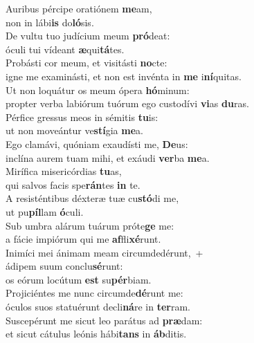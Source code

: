 \evenverse Auribus pércipe oratiónem \textbf{me}am,~\*\\
\evenverse non in lábi\textbf{is} do\textbf{ló}sis.\\
\oddverse De vultu tuo judícium meum \textbf{pró}deat:~\*\\
\oddverse óculi tui vídeant \textbf{æ}qui\textbf{tá}tes.\\
\evenverse Probásti cor meum, et visitásti \textbf{no}cte:~\*\\
\evenverse igne me examinásti, et non est invénta in \textbf{me} i\textbf{ní}quitas.\\
\oddverse Ut non loquátur os meum ópera \textbf{hó}minum:~\*\\
\oddverse propter verba labiórum tuórum ego custodívi \textbf{vi}as \textbf{du}ras.\\
\evenverse Pérfice gressus meos in sémitis \textbf{tu}is:~\*\\
\evenverse ut non moveántur ve\textbf{stí}gia \textbf{me}a.\\
\oddverse Ego clamávi, quóniam exaudísti me, \textbf{De}us:~\*\\
\oddverse inclína aurem tuam mihi, et exáudi \textbf{ver}ba \textbf{me}a.\\
\evenverse Mirífica misericórdias \textbf{tu}as,~\*\\
\evenverse qui salvos facis spe\textbf{rán}tes \textbf{in} te.\\
\oddverse A resisténtibus déxteræ tuæ cu\textbf{stó}di me,~\*\\
\oddverse ut pu\textbf{píl}lam \textbf{ó}culi.\\
\evenverse Sub umbra alárum tuárum próte\textbf{ge} me:~\*\\
\evenverse a fácie impiórum qui me \textbf{af}fli\textbf{xé}runt.\\
\oddverse Inimíci mei ánimam meam circumdedérunt,~+\\
\oddverse  ádipem suum conclu\textbf{sé}runt:~\*\\
\oddverse os eórum locútum \textbf{est} su\textbf{pér}biam.\\
\evenverse Projiciéntes me nunc circumde\textbf{dé}runt me:~\*\\
\evenverse óculos suos statuérunt decli\textbf{ná}re in \textbf{ter}ram.\\
\oddverse Suscepérunt me sicut leo parátus ad \textbf{præ}dam:~\*\\
\oddverse et sicut cátulus leónis hábi\textbf{tans} in \textbf{áb}ditis.\\
